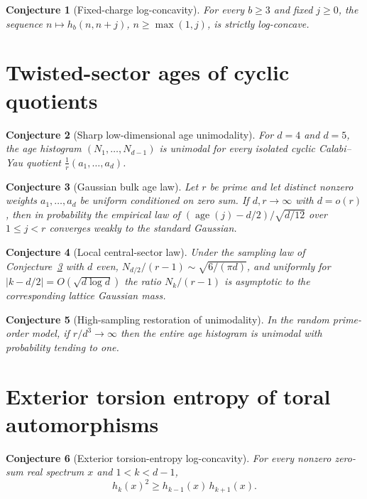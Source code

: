\documentclass[11pt]{article}
\newtheorem{conjecture}{Conjecture}
\theoremstyle{definition}
\begin{document}
\begin{conjecture}[Fixed-charge log-concavity]\label{y8}
For every $b\ge3$ and fixed $j\ge0$, the sequence $n\mapsto h_b(n,n+j)$, $n\ge\max(1,j)$, is strictly log-concave.
\end{conjecture}

\section{Twisted-sector ages of cyclic quotients}

\begin{conjecture}[Sharp low-dimensional age unimodality]\label{y9}
For $d=4$ and $d=5$, the age histogram $(N_1,\ldots,N_{d-1})$ is unimodal for every isolated cyclic Calabi--Yau quotient $\tfrac1r(a_1,\ldots,a_d)$.
\end{conjecture}

\begin{conjecture}[Gaussian bulk age law]\label{y10}
Let $r$ be prime and let distinct nonzero weights $a_1,\ldots,a_d$ be uniform conditioned on zero sum.  If $d,r\to\infty$ with $d=o(r)$, then in probability the empirical law of $(\operatorname{age}(j)-d/2)/\sqrt{d/12}$ over $1\le j<r$ converges weakly to the standard Gaussian.
\end{conjecture}

\begin{conjecture}[Local central-sector law]\label{y11}
Under the sampling law of Conjecture~\ref{y10} with $d$ even, $N_{d/2}/(r-1)\sim\sqrt{6/(\pi d)}$, and uniformly for $|k-d/2|=O(\sqrt{d\log d})$ the ratio $N_k/(r-1)$ is asymptotic to the corresponding lattice Gaussian mass.
\end{conjecture}

\begin{conjecture}[High-sampling restoration of unimodality]\label{y12}
In the random prime-order model, if $r/d^3\to\infty$ then the entire age histogram is unimodal with probability tending to one.
\end{conjecture}

\section{Exterior torsion entropy of toral automorphisms}

\begin{conjecture}[Exterior torsion-entropy log-concavity]\label{y13}
For every nonzero zero-sum real spectrum $x$ and $1<k<d-1$,
\[
h_k(x)^2\ge h_{k-1}(x)\,h_{k+1}(x).
\]
\end{conjecture}
\end{document}
